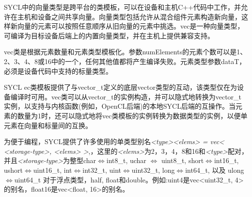 SYCL中的向量类型是跨平台的类模板，可以在设备和主机C++代码中工作，并允许在主机和设备之间共享向量。向量类型包括允许从混合组件元素构造新向量，这样新向量的元素可以按照任意顺序从旧向量的元素中挑选。vec是一种向量类型，可编译为目标设备后端上的内置向量类型，并在主机上提供兼容支持。\par

vec类是根据元素数量和元素类型模板化。参数numElements的元素个数可以是1、2、3、4、8或16中的一个，任何其他值都将产生编译失败。元素类型参数dataT，必须是设备代码中支持的标量类型。\par

SYCL ec类模板提供了与vector\_t定义的底层vector类型的互动，该类型仅在为设备编译时可用。vec类可以从vector\_t的实例构造，并可以隐式地转换为vector\_t实例，以支持与内核函数(例如，OpenCL后端)的本地SYCL后端的互操作。当元素的数量为1时，还可以隐式地将vec类模板的实例转换为数据类型的实例，以便单元素在向量和标量间的互换。\par

为便于编程，SYCL提供了许多使用的单类型别名\textit{<type><elems> = vec< <storage-type>, <elems> >},，这里的\textit{<elems>}为2，3，4，8和16和\textit{<type>}配对，并且\textit{<storage-type>}为整型char$\Leftrightarrow$int8\_t, uchar $\Leftrightarrow$ uint8\_t, short$\Leftrightarrow$int16\_t, ushort$\Leftrightarrow$uint16\_t, int$\Leftrightarrow$int32\_t, uint$\Leftrightarrow$uint32\_t, long$\Leftrightarrow$int64\_t, 以及 ulong$\Leftrightarrow$uint64\_t 对于浮点类型，half, float和double。例如:uint4是vec<uint32\_t, 4>的别名，float16是vec<float, 16>的别名。\par












